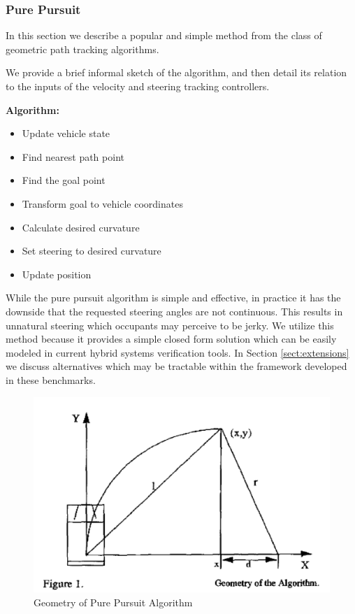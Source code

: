 \subsubsection{Pure Pursuit}
\label{sect:pure-pursuit}
In this section we describe a popular and simple method from the class of geometric path tracking algorithms. 

We provide a brief informal sketch of the algorithm, and then detail its relation to the inputs of the velocity and steering tracking controllers.

\textbf{Algorithm:}
\begin{itemize}
	\item Update vehicle state
	\item Find nearest path point
	\item Find the goal point
	\item Transform goal to vehicle coordinates
	\item Calculate desired curvature
	\item Set steering to desired curvature
	\item Update position
\end{itemize}

While the pure pursuit algorithm is simple and effective, in practice it has the downside that the requested steering angles are not continuous. This results in unnatural steering which occupants may perceive to be jerky. We utilize this method because it provides a simple closed form solution which can be easily modeled in current hybrid systems verification tools. In Section \ref{sect:extensions} we discuss alternatives which may be tractable within the framework developed in these benchmarks.

\begin{figure}
	\centering
	\includegraphics[scale=.5]{figures/pure_pursuit_geom}
	\caption{Geometry of Pure Pursuit Algorithm}
\end{figure}

